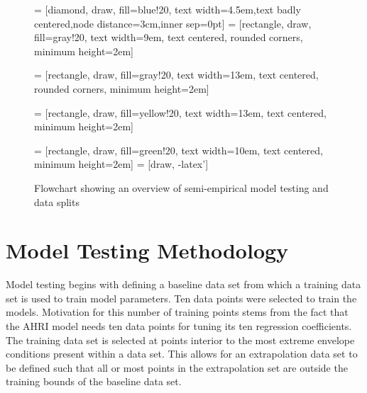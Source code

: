 \documentclass[preprint,11pt,authoryear]{elsarticle}
\begin{document}
\begin{figure}[h] %
\caption{Flowchart showing an overview of semi-empirical model testing and data splits}
 = [diamond, draw, fill=blue!20, text width=4.5em,text badly 									centered,node distance=3cm,inner sep=0pt]
  = [rectangle, draw, fill=gray!20, 
    text width=9em, text centered, rounded corners, minimum height=2em]
    
  = [rectangle, draw, fill=gray!20, 
    text width=13em, text centered, rounded corners, minimum height=2em]
      
  = [rectangle, draw, fill=yellow!20, 
    text width=13em, text centered, minimum height=2em]  
    
  = [rectangle, draw, fill=green!20, 
    text width=10em, text centered, minimum height=2em] 
 = [draw, -latex']

\begin{center}    
\end{center}
\end{figure}


\section{Model Testing Methodology}
\label{sec:methodology}
Model testing begins with defining a baseline data set from which a training data set is used to train model parameters. Ten data points were selected to train the models. Motivation for this number of training points stems from the fact that the AHRI model needs ten data points for tuning its ten regression coefficients. The training data set is selected at points interior to the most extreme envelope conditions present within a data set. This allows for an extrapolation data set to be defined such that all or most points in the extrapolation set are outside the training bounds of the baseline data set. 
\end{document}
